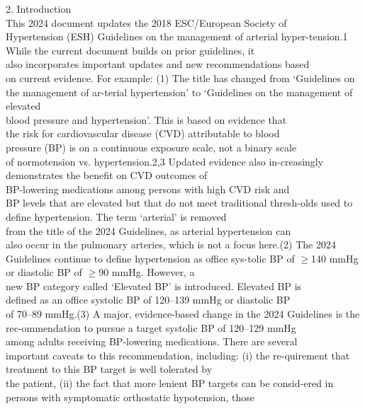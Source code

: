 \documentclass[bs, english]{stthesis}
\begin{document}
2. Introduction\\
This  2024  document  updates  the  2018  ESC/European  Society  of\\
Hypertension (ESH) Guidelines on the management of arterial hyper-tension.1 While  the  current  document  builds  on  prior  guidelines,  it\\
also incorporates important updates and new recommendations based\\
on current evidence. For example: (1) The title has changed from ‘Guidelines on the management of ar-terial hypertension’ to ‘Guidelines on the management of elevated\\
blood pressure and hypertension’. This is based on evidence that\\
the  risk  for  cardiovascular  disease  (CVD)  attributable  to  blood\\
pressure (BP) is on a continuous exposure scale, not a binary scale\\
of  normotension  vs.  hypertension.2,3 Updated  evidence  also  in-creasingly  demonstrates  the  benefit  on  CVD  outcomes  of\\
BP-lowering medications among persons with high CVD risk and\\
BP levels that are elevated but that do not meet traditional thresh-olds  used  to  define  hypertension.  The  term  ‘arterial’  is  removed\\
from the title of the 2024 Guidelines, as arterial hypertension can\\
also occur in the pulmonary arteries, which is not a focus here.(2) The 2024 Guidelines continue to define hypertension as office sys-tolic BP of $\ge$140 mmHg or diastolic BP of $\ge$90 mmHg. However, a\\
new BP category called ‘Elevated BP’ is introduced. Elevated BP is\\
defined as an office systolic BP of 120–139 mmHg or diastolic BP\\
of 70–89 mmHg.(3) A major, evidence-based change in the 2024 Guidelines is the rec-ommendation  to  pursue  a  target  systolic  BP  of  120–129 mmHg\\
among adults receiving BP-lowering medications. There are several\\
important  caveats  to  this  recommendation,  including:  (i)  the  re-quirement  that  treatment  to  this  BP  target  is  well  tolerated  by\\
the patient, (ii) the fact that more lenient BP targets can be consid-ered in persons with symptomatic orthostatic hypotension, those\\
\end{document}
